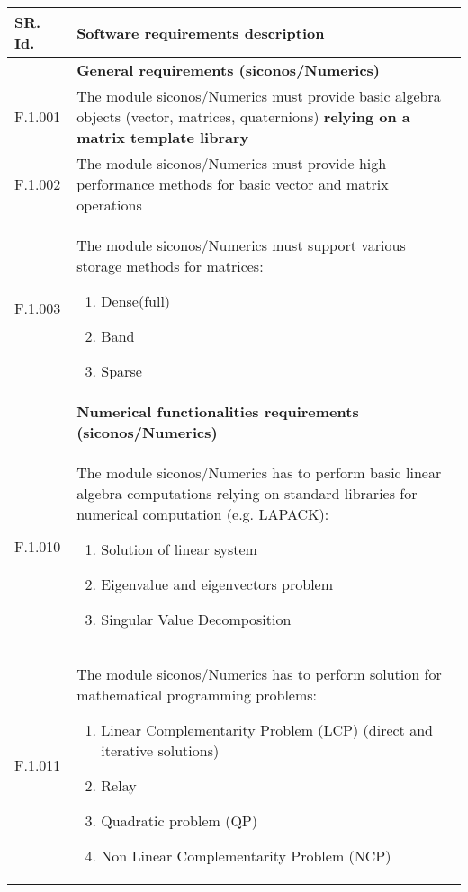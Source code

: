 \begin{longtable}{%
    |>{\columncolor[gray]{.8}}p{}%
    |>{\columncolor[gray]{.95}}p{}|}
  \hline
  \rowcolor[gray]{.8}   SR. Id. & Software requirements description \\
  \hline 
  \hline
  & \textbf{General  requirements (\ac{siconos}/Numerics)}\\
  \hline 
  F.1.001 & The module \ac{siconos}/Numerics must provide basic algebra objects (vector, matrices, quaternions) \bf{ \sf relying on a matrix template library} \\
  F.1.002 & The module \ac{siconos}/Numerics must provide  high performance methods for  basic vector and matrix operations\\
  F.1.003 & The module \ac{siconos}/Numerics must support various storage methods for matrices:
  \begin{enumerate}
  \item Dense(full)
  \item Band
  \item Sparse
  \end{enumerate}\\
 \hline 
 & \textbf{ Numerical functionalities  requirements (\ac{siconos}/Numerics)}\\
  \hline
  F.1.010 & The module  \ac{siconos}/Numerics has to perform basic linear algebra computations  relying on standard libraries for numerical computation (e.g. LAPACK):
  \begin{enumerate}
  \item Solution of linear system 
  \item Eigenvalue and eigenvectors problem
  \item Singular Value Decomposition
  \end{enumerate}
  \\
  F.1.011 & The module \ac{siconos}/Numerics has to perform solution for mathematical programming problems:
  \begin{enumerate}
  \item Linear Complementarity Problem (LCP) (direct and iterative solutions)
  \item Relay
  \item Quadratic problem (QP)
  \item Non Linear Complementarity Problem (NCP)

\end{enumerate}
\end{longtable}
